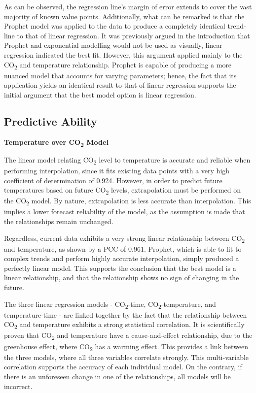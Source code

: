 \documentclass[12pt]{mcmthesis}
\begin{document}
    As can be observed, the regression line’s margin of error extends to cover the vast majority of known value points. Additionally, what can be remarked is that the Prophet model was applied to the data to produce a completely identical trend-line to that of linear regression. It was previously argued in the introduction that Prophet and exponential modelling would not be used as visually, linear regression indicated the best fit. However, this argument applied mainly to the CO\textsubscript{2} and temperature relationship. Prophet is capable of producing a more nuanced model that accounts for varying parameters; hence, the fact that its application yields an identical result to that of linear regression supports the initial argument that the best model option is linear regression.


    \subsection{Predictive Ability}

    \noindent\textbf{Temperature over CO\textsubscript{2} Model}

    The linear model relating CO\textsubscript{2} level to temperature is accurate and reliable when performing interpolation, since it fits existing data points with a very high coefficient of determination of 0.924. However, in order to predict future temperatures based on future CO\textsubscript{2} levels, extrapolation must be performed on the CO\textsubscript{2} model. By nature, extrapolation is less accurate than interpolation. This implies a lower forecast reliability of the model, as the assumption is made that the relationships remain unchanged.

    Regardless, current data exhibits a very strong linear relationship between CO\textsubscript{2} and temperature, as shown by a PCC of 0.961. Prophet, which is able to fit to complex trends and perform highly accurate interpolation, simply produced a perfectly linear model. This supports the conclusion that the best model is a linear relationship, and that the relationship shows no sign of changing in the future.

    The three linear regression models - CO\textsubscript{2}-time, CO\textsubscript{2}-temperature, and temperature-time - are linked together by the fact that the relationship between CO\textsubscript{2} and temperature exhibits a  strong statistical correlation. It is scientifically proven that CO\textsubscript{2} and temperature have a cause-and-effect relationship, due to the greenhouse effect, where CO\textsubscript{2} has a warming effect. This provides a link between the three models, where all three variables correlate strongly. This multi-variable correlation supports the accuracy of each individual model. On the contrary, if there is an unforeseen change in one of the relationships, all models will be incorrect.
\end{document}
